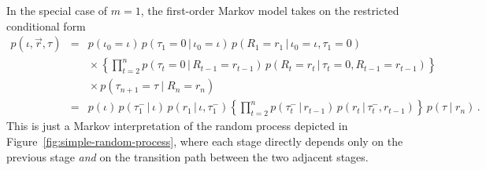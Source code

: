 \documentclass[a4paper]{article}
\begin{document}
In the special case of $m=1$, the first-order Markov model takes on the restricted conditional form
\begin{eqnarray}
p({\iota},\vec{r},{\tau}) & = &
p(\iota_0\!=\!{\iota})\,p(\tau_1\!=\!0\,|\,\iota_0\!=\!{\iota})
\,p(R_1\!=\!r_1\,|\,\iota_0\!=\!{\iota},\tau_1\!=\!0)
\nonumber\\&&
{}\times\left\{\prod_{t=2}^{n}p(\tau_t\!=\!0\,|\,R_{t-1}\!=\!r_{t-1})
\,p(R_t\!=\!r_t\,|\,\tau_t\!=\!0,R_{t-1}\!=\!r_{t-1})\right\}
\nonumber\\&&
{}\times p(\tau_{n+1}\!=\!{\tau}\:|\;R_n\!=\!r_n)
\nonumber\\
& = &
p({\iota})\,p(\tau^-_1\,|\,{\iota})
\,p(r_1\,|\,{\iota},\tau^-_1)
\left\{\prod_{t=2}^{n}p(\tau^-_t\,|\,r_{t-1})
\,p(r_t\,|\,\tau^-_t,r_{t-1})\right\}
\,p({\tau}\:|\;r_n)
\,.
\end{eqnarray}
This is just a Markov interpretation of the random process depicted in Figure~\ref{fig:simple-random-process},
where each stage directly depends only on the previous stage {\em and} on the transition path between the two adjacent stages.
\end{document}

